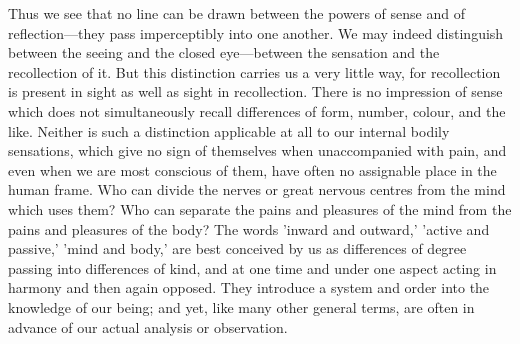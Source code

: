 \documentclass[11pt,letter]{article}
\begin{document}
\par  Thus we see that no line can be drawn between the powers of sense and of reflection—they pass imperceptibly into one another. We may indeed distinguish between the seeing and the closed eye—between the sensation and the recollection of it. But this distinction carries us a very little way, for recollection is present in sight as well as sight in recollection. There is no impression of sense which does not simultaneously recall differences of form, number, colour, and the like. Neither is such a distinction applicable at all to our internal bodily sensations, which give no sign of themselves when unaccompanied with pain, and even when we are most conscious of them, have often no assignable place in the human frame. Who can divide the nerves or great nervous centres from the mind which uses them? Who can separate the pains and pleasures of the mind from the pains and pleasures of the body? The words 'inward and outward,' 'active and passive,' 'mind and body,' are best conceived by us as differences of degree passing into differences of kind, and at one time and under one aspect acting in harmony and then again opposed. They introduce a system and order into the knowledge of our being; and yet, like many other general terms, are often in advance of our actual analysis or observation.
\end{document}

